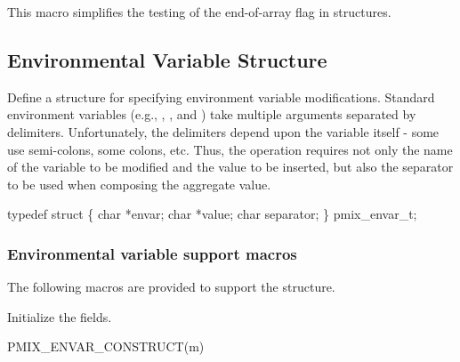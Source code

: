 \begin{arglist}
\end{arglist}

This macro simplifies the testing of the end-of-array flag in  structures.

\subsection{Environmental Variable Structure}

Define a structure for specifying environment variable modifications.
Standard environment variables (e.g., , , and )
take multiple arguments separated by delimiters. Unfortunately, the delimiters
depend upon the variable itself - some use semi-colons, some colons, etc. Thus,
the operation requires not only the name of the variable to be modified and
the value to be inserted, but also the separator to be used when composing
the aggregate value.

\cspecificstart
\begin{codepar}
typedef struct \{
    char *envar;
    char *value;
    char separator;
\} pmix_envar_t;
\end{codepar}
\cspecificend

\subsubsection{Environmental variable support macros}

The following macros are provided to support the  structure.


Initialize the  fields.

\cspecificstart
\begin{codepar}
PMIX_ENVAR_CONSTRUCT(m)
\end{codepar}
\cspecificend

\begin{arglist}
\end{arglist}

